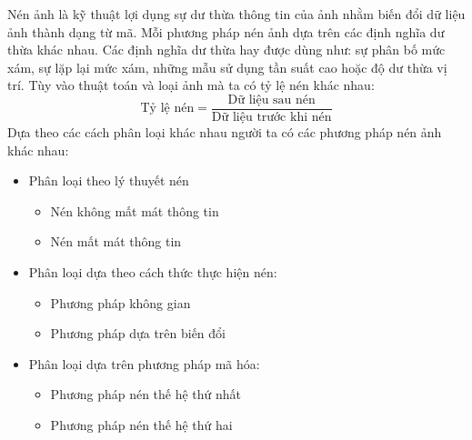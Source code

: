 \documentclass[12pt, oneside, a4]{book}
\begin{document}
Nén ảnh là kỹ thuật lợi dụng sự dư thừa thông tin của ảnh nhằm biến đổi dữ liệu ảnh thành dạng từ mã. Mỗi phương pháp nén ảnh dựa trên các định nghĩa dư thừa khác nhau. Các định nghĩa dư thừa hay được dùng như: sự phân bố mức xám, sự lặp lại mức xám, những mẫu sử dụng tần suất cao hoặc độ dư thừa vị trí. Tùy vào thuật toán và loại ảnh mà ta có tỷ lệ nén khác nhau: 
\begin{equation*}
\textrm{Tỷ lệ nén} =\dfrac{\textrm{Dữ liệu sau nén}}{\textrm{Dữ liệu trước khi nén}}
\end{equation*}
Dựa theo các cách phân loại khác nhau người ta có các phương pháp nén ảnh khác nhau:
\begin{itemize}
\item Phân loại theo lý thuyết nén
\begin{itemize}
\item Nén không mất mát thông tin
\item Nén mất mát thông tin
\end{itemize}
\item Phân loại dựa theo cách thức thực hiện nén: 
\begin{itemize}
\item Phương pháp không gian
\item Phương pháp dựa trên  biến đổi
\end{itemize}
\item Phân loại dựa trên phương pháp mã hóa:
\begin{itemize}
\item Phương pháp nén thế hệ thứ nhất
\item Phương pháp nén thế hệ thứ hai
\end{itemize}
\end{itemize}
%
\end{document}
